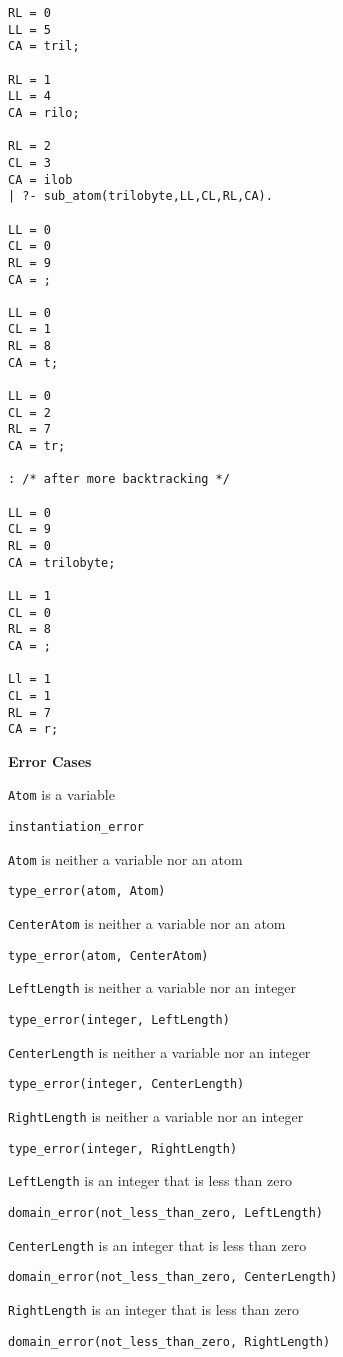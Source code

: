 \begin{description}
{\begin{verbatim}
RL = 0
LL = 5
CA = tril;

RL = 1
LL = 4
CA = rilo;

RL = 2
CL = 3
CA = ilob
| ?- sub_atom(trilobyte,LL,CL,RL,CA).

LL = 0
CL = 0
RL = 9
CA = ;

LL = 0
CL = 1
RL = 8
CA = t;

LL = 0
CL = 2
RL = 7
CA = tr;

: /* after more backtracking */

LL = 0
CL = 9
RL = 0
CA = trilobyte;

LL = 1
CL = 0
RL = 8
CA = ;

Ll = 1
CL = 1
RL = 7
CA = r;
\end{verbatim}
}

{\bf Error Cases}
\bi
\item  {\tt Atom} is a variable
\bi
\item {\tt instantiation\_error}
\ei
\item  {\tt Atom} is neither a variable nor an atom
\bi
\item {\tt type\_error(atom, Atom)}
\ei
\item  {\tt CenterAtom} is neither a variable nor an atom
\bi
\item {\tt type\_error(atom, CenterAtom)}
\ei
\item  {\tt LeftLength} is neither a variable nor an integer
\bi
\item  {\tt  type\_error(integer, LeftLength)}
\ei
\item  {\tt CenterLength} is neither a variable nor an integer
\bi
\item  {\tt  type\_error(integer, CenterLength)}
\ei
\item  {\tt RightLength} is neither a variable nor an integer
\bi
\item  {\tt type\_error(integer, RightLength)}
\ei
\item  {\tt LeftLength} is an integer that is less than zero
\bi
\item  {\tt  domain\_error(not\_less\_than\_zero, LeftLength)}
\ei
\item  {\tt CenterLength} is an integer that is less than zero
\bi
\item  {\tt  domain\_error(not\_less\_than\_zero, CenterLength)}
\ei
\item  {\tt RightLength} is an integer that is less than zero
\bi
\item  {\tt  domain\_error(not\_less\_than\_zero, RightLength)}
\ei
\ei


\end{description}
